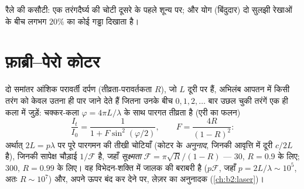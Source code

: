 \begin{omfigure}

{\small रैले की कसौटी: एक तरंगदैर्घ्य की चोटी दूसरे के पहले
शून्य पर; और योग (बिंदुदार) दो सुलझी रेखाओं के बीच लगभग $20\%$ का कोई
गड्ढा दिखाता है।}
\end{omfigure}

\section{फ़ाब्री--पेरो कोटर}

\begin{proposition}[आयाम-विभाजन से बहु-तरंग व्यतिकरण]\label{prop:b2:gratings:fabryperot}
दो समांतर आंशिक परावर्ती दर्पण (तीव्रता-परावर्तकता $R$), जो $L$ दूरी पर हैं,
अभिलंब आपतन में किसी तरंग को केवल उतना ही पार जाने देते हैं
जितना उनके बीच $0, 1, 2, \dots$ बार उछल चुकी तरंगें एक ही
कला में जुड़ें: चक्कर-कला $\varphi = 4\pi L/\lambda$ के साथ पारगत
तीव्रता है (एरी का फलन)
\[
\frac{I_t}{I_0} = \frac1{1 + F\sin^2(\varphi/2)} , \qquad F = \frac{4R}{(1 - R)^2} :
\]
अर्थात् $2L = p\lambda$ पर पूरे पारगमन की तीखी चोटियाँ (कोटर के
\emph{अनुनाद}, जिनकी आवृत्ति में दूरी \emph{}
$c/2L$ है), जिनकी सापेक्ष चौड़ाई $1/\mathcal F$ है, जहाँ \emph{सूक्ष्मता} $\mathcal F = \pi
\sqrt R/(1 - R)$ --- $30$, $R = 0.9$ के लिए; $300$, $R = 0.99$ के लिए। वह विभेदन-शक्ति में जालक की
बराबरी है ($p\mathcal F$, जहाँ $p = 2L/\lambda \sim 10^5$, अतः $R \sim
10^7$) और, अपने ऊपर बंद कर देने पर, लेज़र का अनुनादक
(\cref{ch:b2:laser})।
\end{proposition}

